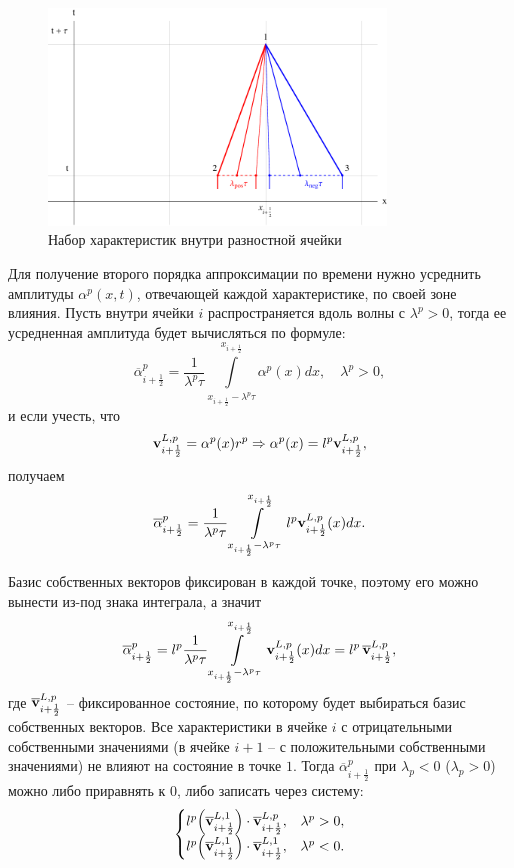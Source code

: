 \documentclass[12pt,a4paper]{article}
\newcommand{\half}{\frac{1}{2}}
\begin{document}
    \begin{figure}[h]
        \centering
        \includegraphics[width=0.8\textwidth]{influence.pdf}
        \caption{Набор характеристик внутри разностной ячейки}
        \label{fig:influence}
    \end{figure}

    Для получение второго порядка аппроксимации по времени нужно усреднить амплитуды $ \alpha^p(x,t) $, отвечающей каждой характеристике, по своей зоне влияния. Пусть внутри ячейки $i$ распространяется вдоль волны с $\lambda^p > 0$, тогда ее усредненная амплитуда будет вычисляться по формуле:
    \[
        \overline{\alpha}^p_{i + \half} = \dfrac{1}{\lambda^p \tau} \int \limits_{x_{i + \half} - \lambda^p \tau}^{x_{i + \half}} \alpha^p (x) dx, \quad \lambda^p > 0,
    \]
    \noindent и если учесть, что 
    \[
      \bold v_{i + \half}^{L, p} = \alpha^p (x) r^p \Rightarrow \alpha^p (x) = l^p \bold v_{i + \half}^{L, p},
    \]
    \noindent получаем
    \[
        \overline{\alpha}^p_{i + \half} = \dfrac{1}{\lambda^p \tau} \int \limits_{x_{i + \half} - \lambda^p \tau}^{x_{i + \half}} l^p \bold v_{i + \half}^{L, p} (x) dx.
    \]

    Базис собственных векторов фиксирован в каждой точке, поэтому его можно вынести из-под знака интеграла, а значит 
    \[
        \overline{\alpha}^p_{i + \half} = l^p \dfrac{1}{\lambda^p \tau} \int \limits_{x_{i + \half} - \lambda^p \tau}^{x_{i + \half}} \bold v_{i + \half}^{L, p} (x) dx = l^p \, \overline{\bold v}_{i + \half}^{L, p},
    \]
    \noindent где $ \overline{\bold v}_{i + \half}^{L, p} $ -- фиксированное состояние, по которому будет выбираться базис собственных векторов. Все характеристики в ячейке $ i $ с отрицательными собственными значениями (в ячейке $i + 1$ -- с положительными собственными значениями) не влияют на состояние в точке $1$. Тогда $\overline{\alpha}^p_{i + \half}$ при $\lambda_p < 0$ ($\lambda_p > 0$) можно либо приравнять к $0$, либо записать через систему:
    \[
        \begin{cases}
            l^p \Bigl(\overline{\bold v}_{i + \half}^{L, 1}\Bigr) \cdot \overline{\bold v}_{i + \half}^{L, p}, & \lambda^p > 0, \\
            l^p \Bigl(\overline{\bold v}_{i + \half}^{L, 1}\Bigr) \cdot \overline{\bold v}_{i + \half}^{L, 1}, & \lambda^p < 0.
        \end{cases}
    \]
\end{document}
